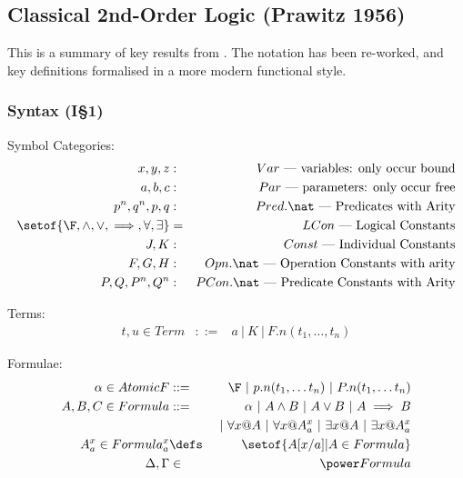 \subsection{Classical 2nd-Order Logic (Prawitz 1956)}

This is a summary of key results from \cite{Prawitz56}.
The notation has been re-worked, and key definitions
formalised in a more modern functional style.

\subsubsection{Syntax (I\S1)}

Symbol Categories:
\begin{eqnarray*}
   x,y,z &:& Var \mbox{ --- variables: only occur bound}
\\ a,b,c &:& Par \mbox{ --- parameters: only occur free}
\\ p^n,q^n,p,q &:& Pred.\nat \mbox{ --- Predicates with Arity}
\\ \setof{\F,\land,\lor,\implies,\forall,\exists} &=& LCon \mbox{ --- Logical Constants}
\\ J,K &:& Const \mbox{ --- Individual Constants}
\\ F,G,H &:& Opn.\nat \mbox{ --- Operation Constants with arity}
\\ P,Q,P^n,Q^n &:& PCon.\nat \mbox{ --- Predicate Constants with Arity}
\end{eqnarray*}

Terms:
\begin{eqnarray*}
    t,u \in Term &::=& a ~|~ K ~|~ F.n(t_1, \ldots, t_n)
\end{eqnarray*}

Formulae:
\begin{eqnarray*}
   \alpha \in AtomicF &::=& \F ~|~ p.n(t_1, \ldots t_n) ~|~ P.n(t_1, \ldots t_n)
\\ A,B,C \in Formula &::=& \alpha ~|~ A \land B ~|~ A \lor B ~|~ A \implies B
\\ && {} ~|~ \forall x @ A ~|~ \forall x @ A^x_a ~|~ \exists x @ A ~|~ \exists x @ A^x_a
\\ A^x_a \in Formula^x_a &\defs& \setof{ A[x/a] | A \in Formula }
\\ \Delta,\Gamma &\in& \power Formula
\end{eqnarray*}

